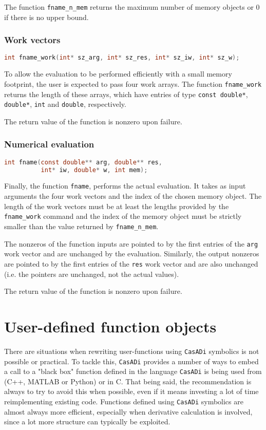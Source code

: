 \documentclass[a4paper,12pt]{book}
\newcommand{\CasADi}{\texttt{CasADi}\xspace}
\newcommand{\cxx}[1]{\lstinline[language=C++]{#1}}
\begin{document}
The function \verb|fname_n_mem| returns the maximum number of memory objects
or 0 if there is no upper bound.

\subsection*{Work vectors}
\begin{lstlisting}[language=C]
int fname_work(int* sz_arg, int* sz_res, int* sz_iw, int* sz_w);
\end{lstlisting}

To allow the evaluation to be performed efficiently with a small memory
footprint, the user is expected to pass four work arrays. The function
\verb|fname_work| returns the length of these arrays, which have entries
of type \verb|const double*|, \verb|double*|, \verb|int| and \verb|double|,
respectively.

The return value of the function is nonzero upon failure.

\subsection*{Numerical evaluation}
\begin{lstlisting}[language=C]
int fname(const double** arg, double** res,
          int* iw, double* w, int mem);
\end{lstlisting}

Finally, the function \verb|fname|, performs the actual evaluation. It takes
as input arguments the four work vectors and the index of the chosen memory
object. The length of the work vectors must be at least the lengths provided
by the \cxx{fname_work} command and the index of the memory object must be strictly
smaller than the value returned by \cxx{fname_n_mem}.

The nonzeros of the function inputs are pointed to by the
first entries of the \texttt{arg} work vector and are unchanged by the evaluation.
Similarly, the output nonzeros are pointed to by the first entries of the
\texttt{res} work vector and are also unchanged (i.e. the pointers are unchanged,
not the actual values).

The return value of the function is nonzero upon failure.


\chapter{User-defined function objects} \label{ch:user-defined}
There are situations when rewriting user-functions using \CasADi symbolics is not
possible or practical. To tackle this, \CasADi provides a number of ways to
embed a call to a "black box" function defined in the language \CasADi is being
used from (C++, MATLAB or Python) or in C.
That being said, the recommendation is always to try to avoid this when possible,
even if it means investing a lot of time reimplementing existing code.
Functions defined using \CasADi symbolics are almost always more
efficient, especially when derivative calculation is involved, since a lot more
structure can typically be exploited.
\end{document}
